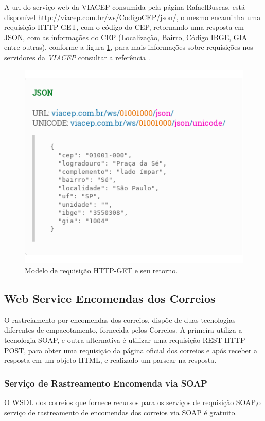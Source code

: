\documentclass[12pt]{article}
\begin{document}
	A url do serviço web da VIACEP consumida pela página RafaelBuscas, está disponível http://viacep.com.br/ws/CodigoCEP/json/, o mesmo encaminha uma requisição HTTP-GET, com o código do CEP, retornando uma resposta em JSON, com as informações do CEP (Localização, Bairro, Código IBGE, GIA entre outras), conforme a figura \ref{c33}, para mais informações sobre requisições nos servidores da \textit{VIACEP} consultar a referência \cite{viacep}. 
	 \begin{figure}[H]
		\centering
		\includegraphics[scale=0.6]{Imagens/via.png}
		\caption{Modelo de requisição HTTP-GET e seu retorno.}
		\label{c33}
	\end{figure}
\subsection{Web Service Encomendas dos Correios}
	O rastreiamento por encomendas dos correios, dispõe de duas tecnologias diferentes de empacotamento, fornecida pelos Correios. A primeira utiliza a tecnologia SOAP, e outra alternativa é utilizar uma requisição REST HTTP-POST, para obter uma requisição da página oficial dos correios e após receber a resposta em um objeto HTML, e realizado um parsear na resposta.
\subsubsection{Serviço de Rastreamento Encomenda via SOAP}
O WSDL dos correios que fornece recursos para os serviços de requisição SOAP,o serviço de rastreamento de encomendas dos correios via SOAP é gratuito.
\end{document}
